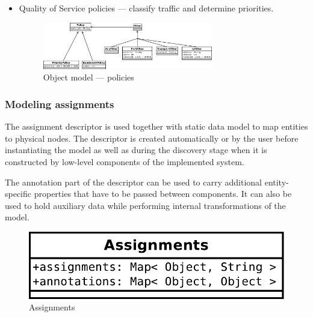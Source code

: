 \documentclass[11pt]{book}
\begin{document}
\begin{itemize}
            \item Quality of Service policies --- classify traffic and determine priorities.

                  \begin{figure}[H]
                    \begin{center}
                      \includegraphics[width=0.7\textwidth]{img/architecture/om-policy.pdf}
                    \end{center}
                    \caption{Object model --- policies}
                  \end{figure}

          \end{itemize}


        \subsubsection{Modeling assignments}

          The assignment descriptor is used together with static data model to map entities to physical nodes. The
          descriptor is created automatically or by the user before instantiating the model as well as during the
          discovery stage when it is constructed by low-level components of the implemented system.

          The annotation part of the descriptor can be used to carry additional entity-specific properties that have to
          be passed between components. It can also be used to hold auxiliary data while performing internal
          transformations of the model.

          \begin{figure}[H]
            \begin{center}
              \includegraphics[scale=.5]{img/architecture/assignments.pdf}
            \end{center}

            \caption{Assignments}
          \end{figure}
\end{document}
